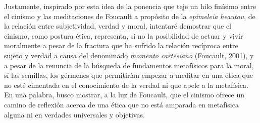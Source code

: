 \begin{refsection}
Justamente, inspirado por esta idea de la ponencia que teje un hilo finísimo entre el cinismo y las meditaciones de Foucault a propósito de la \emph{epimeleia heautou}, de la relación entre subjetividad, verdad y moral, intentaré demostrar que el cinismo, como postura ética, representa, si no la posibilidad de actuar y vivir moralmente a pesar de la fractura que ha sufrido la relación recíproca entre sujeto y verdad a causa del denominado \emph{momento cartesiano} (Foucault, 2001), y a pesar de la renuncia de la búsqueda de fundamentos metafísicos para la moral, sí las semillas, los gérmenes que permitirían empezar a meditar en una ética que no esté cimentada en el conocimiento de la verdad ni que apele a la metafísica. En una palabra, busco mostrar, a la luz de Foucault, que el cinismo ofrece un camino de reflexión acerca de una ética que no está amparada en metafísica alguna ni en verdades universales y objetivas.


\end{refsection}
